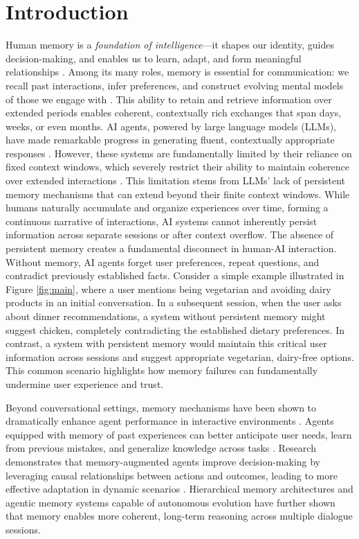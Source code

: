 \section{Introduction}
\label{sec:intro}


Human memory is a \emph{foundation of intelligence}—it shapes our identity, guides decision-making, and enables us to learn, adapt, and form meaningful relationships \citep{craik1992human}. Among its many roles, memory is essential for communication: we recall past interactions, infer preferences, and construct evolving mental models of those we engage with \citep{assmann2011communicative}. This ability to retain and retrieve information over extended periods enables coherent, contextually rich exchanges that span days, weeks, or even months. AI agents, powered by large language models (LLMs), have made remarkable progress in generating fluent, contextually appropriate responses \citep{yu2024finmem, zhang2024survey}. However, these systems are fundamentally limited by their reliance on fixed context windows, which severely restrict their ability to maintain coherence over extended interactions \citep{bulatov2022recurrent, liu2023think}. 
This limitation stems from LLMs' lack of persistent memory mechanisms that can extend beyond their finite context windows. While humans naturally accumulate and organize experiences over time, forming a continuous narrative of interactions, AI systems cannot inherently persist information across separate sessions or after context overflow.
The absence of persistent memory creates a fundamental disconnect in human-AI interaction. Without memory, AI agents forget user preferences, repeat questions, and contradict previously established facts. 
Consider a simple example illustrated in Figure \ref{fig:main}, where a user mentions being vegetarian and avoiding dairy products in an initial conversation. 
In a subsequent session, when the user asks about dinner recommendations, a system without persistent memory might suggest chicken, completely contradicting the established dietary preferences. In contrast, a system with persistent memory would maintain this critical user information across sessions and suggest appropriate vegetarian, dairy-free options. This common scenario highlights how memory failures can fundamentally undermine user experience and trust.

Beyond conversational settings, memory mechanisms have been shown to dramatically enhance agent performance in interactive environments \citep{majumderclin, shinn2023reflexion}. Agents equipped with memory of past experiences can better anticipate user needs, learn from previous mistakes, and generalize knowledge across tasks \citep{chhikara2023knowledge}. Research demonstrates that memory-augmented agents improve decision-making by leveraging causal relationships between actions and outcomes, leading to more effective adaptation in dynamic scenarios \citep{rasmussen2025zep}. Hierarchical memory architectures \citep{packer2023memgpt, sarthi2024raptor} and agentic memory systems capable of autonomous evolution \citep{xu2025mem} have further shown that memory enables more coherent, long-term reasoning across multiple dialogue sessions.



